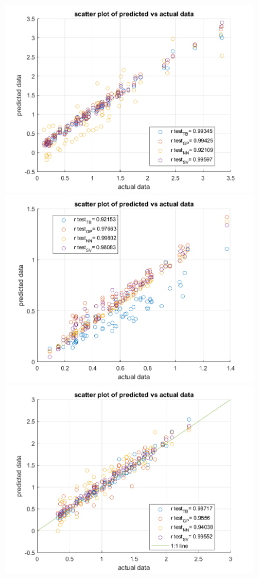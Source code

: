 \documentclass[12pt]{iopart}
\begin{document}
\begin{figure}[ht!]
\begin{center}
\begin{minipage}{0.495\textwidth}
    \includegraphics[width=1\textwidth]{disp_2.5T.png}
\end{minipage}
\begin{minipage}{0.495\textwidth}
    \includegraphics[width=1\textwidth]{cond_2.5T.png}
\end{minipage}
\begin{minipage}{0.495\textwidth}
    \includegraphics[width=1\textwidth]{disp_500mT.png}

\end{minipage}
\end{center}
\end{figure}
\end{document}
